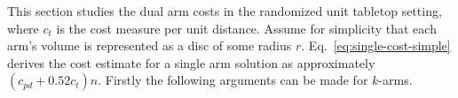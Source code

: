 	






This section studies the dual arm costs in the randomized unit tabletop setting, where $c_t$ is the cost measure per unit distance.  Assume for simplicity that each arm's volume is represented as a disc of some radius $r$. Eq.~\ref{eq:single-cost-simple} derives the cost estimate for a single arm solution as approximately $(c_{pd} + 0.52c_t)n$. Firstly the following arguments can be made for $k$-arms.


